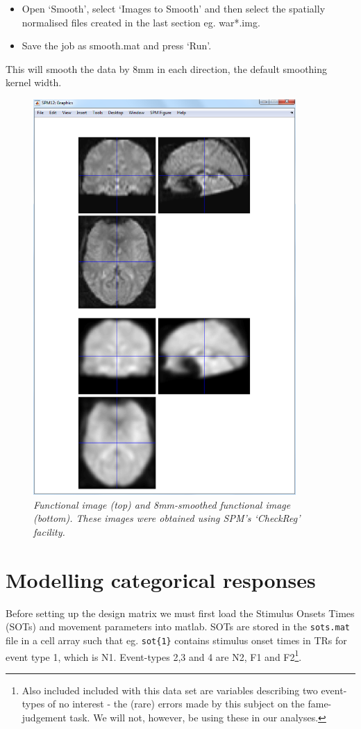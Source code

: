 \documentclass[a4paper,titlepage]{book}
\newcommand{\bi}{\begin{itemize}}
\newcommand{\ei}{\end{itemize}}
\begin{document}
\bi
\item{Open `Smooth', select `Images to Smooth' and then 
select the spatially normalised files created in the 
last section eg. {\sf war*.img}. }
\item{Save the job as {\sf smooth.mat} and press `Run'.}
\ei
This will smooth the data by 8mm in each direction, 
the default smoothing kernel width.
\begin{figure}
\begin{center}
\includegraphics[width=100mm]{smooth}
\caption{\em Functional image (top) and 8mm-smoothed functional image (bottom). These images were obtained using SPM's `CheckReg' facility. \label{face_smooth}}
\end{center}
\end{figure}

\section{Modelling categorical responses}


Before setting up the design matrix we must first 
load the Stimulus Onsets Times (SOTs) and movement
parameters into matlab. SOTs are stored in the 
\verb!sots.mat! file in a 
cell array such that eg. \verb!sot{1}! contains 
stimulus onset times in TRs for event type 1, which is N1. Event-types 2,3 and 4 are N2, F1 and F2\footnote{Also included included with this data set are variables describing two event-types of no interest - the (rare) errors made by this subject on the fame-judgement task. 
We will not, however, be using these in our analyses.}.
\end{document}
